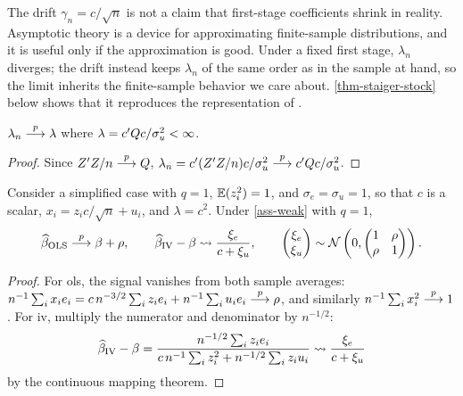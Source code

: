 \documentclass[a4paper,12pt]{article}
\begin{document}
\begin{remark}[What Does $\gamma_n=c/\sqrt{n}$ Mean?]
	The drift $\gamma_n=c/\sqrt n$ is not a claim that first-stage coefficients shrink in reality.
	Asymptotic theory is a device for approximating finite-sample distributions, and it is useful only if the approximation is good.
	Under a fixed first stage, $\lambda_n$ diverges;
	the drift instead keeps $\lambda_n$ of the same order as in the sample at hand, so the limit inherits the finite-sample behavior we care about.
	\autoref{thm-staiger-stock} below shows that it reproduces the representation of \textcite{rothenberg-1984}.
\end{remark}

\begin{lemma}
	$\lambda_n\overset{p}{\longrightarrow}\lambda$ where $\lambda=c^{\prime} Qc/\sigma_u^2<\infty$.
\end{lemma}
\begin{proof}
	Since $Z^{\prime} Z/n\overset{p}{\longrightarrow} Q$, $\lambda_n=c^{\prime}(Z^{\prime} Z/n)c/\sigma_u^2\overset{p}{\longrightarrow} c^{\prime} Qc/\sigma_u^2$.
\end{proof}



\begin{proposition}[Simplified Case with $q=1$]\label{prop-scalar}
	Consider a simplified case with $q=1$, $\operatorname{\mathbb{E}}(z_i^2)=1$, and $\sigma_e=\sigma_u=1$,
	so that $c$ is a scalar, $x_i=z_ic/\sqrt n+u_i$, and $\lambda=c^2$.
	Under \autoref{ass-weak} with $q=1$,
	\begin{align}
		\widehat\beta_{\mathrm{OLS}}\overset{p}{\longrightarrow}\beta+\rho,
		\qquad
		\widehat\beta_{\mathrm{IV}}-\beta\overset{}{\leadsto}\frac{\xi_e}{c+\xi_u},
		\qquad
		\begin{pmatrix}\xi_e\\\xi_u\end{pmatrix}
		\sim\operatorname{\mathcal{N}}\left(0,\begin{pmatrix}1&\rho\\\rho&1\end{pmatrix}\right).
	\end{align}
\end{proposition}
\begin{proof}
	For \gls{ols}, the signal vanishes from both sample averages:
	$n^{-1}\sum_ix_ie_i=c\,n^{-3/2}\sum_iz_ie_i+n^{-1}\sum_iu_ie_i\overset{p}{\longrightarrow}\rho$,
	and similarly $n^{-1}\sum_ix_i^2\overset{p}{\longrightarrow}1$.
	For \gls{iv}, multiply the numerator and denominator by $n^{-1/2}$:
	\begin{align*}
		\widehat\beta_{\mathrm{IV}}-\beta
		=\frac{n^{-1/2}\sum_iz_ie_i}{c\,n^{-1}\sum_iz_i^2+n^{-1/2}\sum_iz_iu_i}
		\overset{}{\leadsto}\frac{\xi_e}{c+\xi_u}
	\end{align*}
	by the continuous mapping theorem.
\end{proof}
\end{document}
